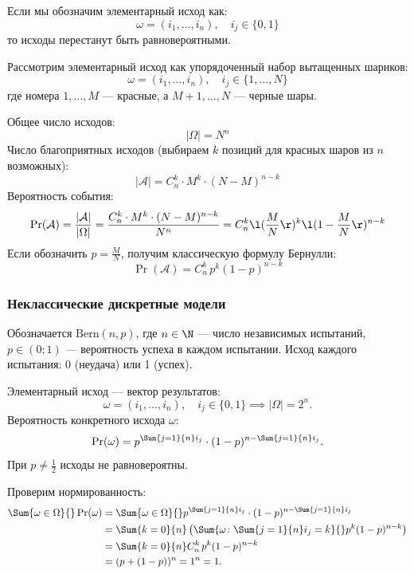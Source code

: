 \begin{solution}
    Если мы обозначим элементарный исход как: 
    \[
        \omega = (i_1, \dots, i_n), \quad i_j \in \{0, 1\}
    \]
    то исходы перестанут быть равновероятными. 

    Рассмотрим элементарный исход как упорядоченный набор вытащенных шариков:
    \[
        \omega = (i_1, \dots, i_n), \quad i_j \in \{1, \dots, N\}
    \]
    где номера $1, \dots, M$ --- красные, а $M+1, \dots, N$ --- черные шары.
    
    Общее число исходов:
    \[
        |\Omega| = N^n
    \]
    Число благоприятных исходов (выбираем $k$ позиций для красных шаров из $n$ возможных):
    \[
        |\mathcal{A}| = C_n^k \cdot M^k \cdot (N - M)^{n - k}
    \]
    Вероятность события:
    \[
        \Pr(\mathcal{A}) = \frac{|\mathcal{A}|}{|\Omega|} = \frac{C_n^k \cdot M^k \cdot (N - M)^{n-k}}{N^n} = C_n^k \l( \frac{M}{N} \r)^k \l(1 - \frac{M}{N} \r)^{n-k}  
    \]
    Если обозначить $p = \frac{M}{N}$, получим классическую формулу Бернулли:
    \[
        \Pr(\mathcal{A}) = C_n^k \, p^k (1 - p)^{n-k} 
    \]
\end{solution}

\subsubsection{Неклассические дискретные модели}

\begin{definition}
    Обозначается $\mathrm{Bern}(n, p)$, где $n \in \N$ ---
    число независимых испытаний, $p \in (0; 1)$ ---
    вероятность успеха в каждом испытании.
    Исход каждого испытания: 0 (неудача) или 1 (успех).

    Элементарный исход --- вектор результатов:
    \[
        \omega = (i_1, \dots, i_n), \quad
        i_j \in \{0, 1\}
        \implies |\Omega| = 2^n.
    \]
    Вероятность конкретного исхода $\omega$:
    \[
        \Pr(\omega)
        =
        p^{\Sum{j=1}{n} i_j}
        \cdot (1-p)^{n-\Sum{j=1}{n} i_j}.
    \]
    При $p \neq \frac12$ исходы не равновероятны.
\end{definition}

\begin{Proof}
    Проверим нормированность:
    \[
    \begin{aligned}
        \Sum{\omega \in \Omega}{} \Pr(\omega)
        &=
        \Sum{\omega \in \Omega}{}
        p^{\Sum{j=1}{n} i_j}
        \cdot (1-p)^{n-\Sum{j=1}{n} i_j}
        \\
        &=
        \Sum{k=0}{n}
        \left(
            \Sum{\omega \colon \Sum{j=1}{n} i_j = k}{}
            p^k (1-p)^{n-k}
        \right)
        \\
        &=
        \Sum{k=0}{n} C_n^k \, p^k (1-p)^{n-k}
        \\
        &=
        (p+(1-p))^n = 1^n = 1.
    \end{aligned}
    \]
\end{Proof}

